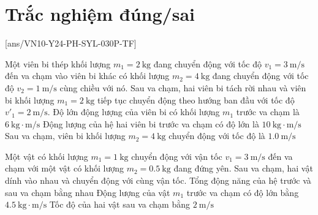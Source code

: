 \section{Trắc nghiệm đúng/sai}
\setcounter{ex}{0}
[ans/VN10-Y24-PH-SYL-030P-TF]
\begin{ex}
	Một viên bi thép khối lượng $m_1=\SI{2}{\kilogram}$ đang chuyển động với tốc độ $v_1=\SI{3}{\meter/\second}$ đến va chạm vào viên bi khác có khối lượng $m_2=\SI{4}{\kilogram}$ đang chuyển động với tốc độ $v_2=\SI{1}{\meter/\second}$ cùng chiều với nó. Sau va chạm, hai viên bi tách rời nhau và viên bi khối lượng $m_1=\SI{2}{\kilogram}$ tiếp tục chuyển động theo hướng ban đầu với tốc độ $v'_1=\SI{2}{\meter/\second}$.
	{\True Độ lớn động lượng của viên bi có khối lượng $m_1$ trước va chạm là $\SI{6}{\kilogram\cdot\meter/\second}$}
	{\True Động lượng của hệ hai viên bi trước va chạm có độ lớn là $\SI{10}{\kilogram\cdot\meter/\second}$}
	{Sau va chạm, viên bi khối lượng $m_2=\SI{4}{\kilogram}$ chuyển động với tốc độ là $\SI{1.0}{\meter/\second}$}
	\loigiai{}
\end{ex}
\begin{ex}
	Một vật có khối lượng $m_1=\SI{1}{\kilogram}$ chuyển động với vận tốc $v_1=\SI{3}{\meter/\second}$ đến va chạm với một vật có khối lượng $m_2=\SI{0.5}{\kilogram}$ đang đứng yên. Sau va chạm, hai vật dính vào nhau và chuyển động với cùng vận tốc.
	{Tổng động năng của hệ trước và sau va chạm bằng nhau}
	{Động lượng của vật $m_1$ trước va chạm có độ lớn bằng $\SI{4.5}{\kilogram\cdot\meter/\second}$}
	{\True Tốc độ của hai vật sau va chạm bằng $\SI{2}{\meter/\second}$}
\end{ex}
